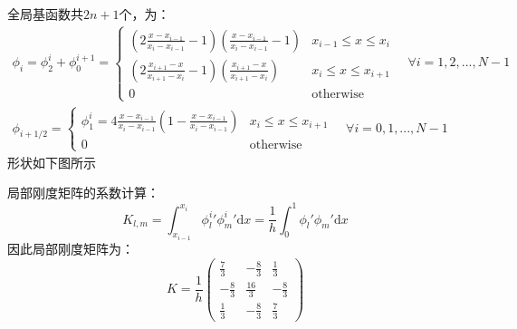\documentclass{ctexart}
\begin{document}
全局基函数共$2n+1$个，为：
\begin{eqnarray}
  \phi_i = \phi_2^i + \phi_0^{i+1} = \begin{cases}
    \left(2\frac{x-x_{i-1}}{x_i - x_{i-1}} -1\right)\left(\frac{x-x_{i-1}}{x_i - x_{i-1}}-1\right) & x_{i-1} \le x \le x_i\\
    \left(2\frac{x_{i+1}-x}{x_{i+1} - x_{i}} -1\right)\left(\frac{x_{i+1}-x}{x_{i+1} - x_{i}}\right) & x_{i} \le x \le x_{i+1}\\ 
    0 & \text{otherwise}
  \end{cases}\quad \forall i = 1, 2, ..., N-1\\
  \phi_{i+1/2} = \begin{cases}
    \phi_1^{i} = 4 \frac{x - x_{i-1}}{x_i - x_{i-1}}\left(1-\frac{x - x_{i-1}}{x_i - x_{i-1}}\right)  & x_{i} \le x \le x_{i+1}\\
    0 & \text{otherwise}
  \end{cases}\quad \forall i = 0, 1, ..., N-1
\end{eqnarray}
形状如下图所示
\begin{figure}[H]
    \centering
\end{figure}

局部刚度矩阵的系数计算：
\begin{equation}
    K_{l, m} =
     \int_{x_{i-1}} ^ {x_{i}} {\phi^{i}_l}' {\phi^{i}_m}' \mathrm dx 
     = \frac{1}{h}\int_0^1 \phi_l ' \phi_m ' \mathrm dx
\end{equation}
因此局部刚度矩阵为：
\begin{equation}
    K = \frac{1}{h} \begin{pmatrix}
        \frac{7}{3} & -\frac{8}{3} & \frac{1}{3}\\
        -\frac{8}{3} & \frac{16}{3} & -\frac{8}{3}\\
        \frac{1}{3} & -\frac{8}{3} & \frac{7}{3}
    \end{pmatrix}
\end{equation}
\end{document}
